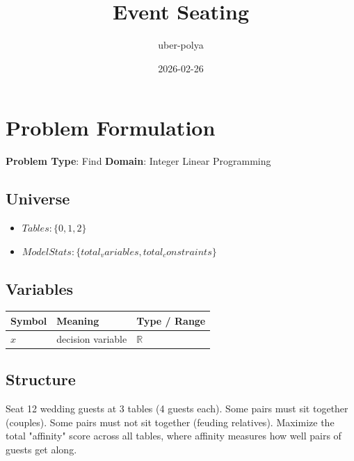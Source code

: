 \documentclass[11pt, a4paper]{article}
\title{Event Seating}
\author{uber-polya}
\date{2026-02-26}
\begin{document}
\maketitle
\tableofcontents
\newpage

\section{Problem Formulation}

\begin{polyamodel}

\textbf{Problem Type}: Find \hfill
\textbf{Domain}: Integer Linear Programming


\end{polyamodel}

\subsection{Universe}

\begin{itemize}
  \item $Tables: \{0, 1, 2\}$
  \item $Model Stats: \{total_variables, total_constraints\}$
\end{itemize}

\subsection{Variables}

\begin{longtable}{lll}
\toprule
\textbf{Symbol} & \textbf{Meaning} & \textbf{Type / Range} \\
\midrule
\endhead
$x$ & decision variable & $\mathbb{{R}}$ \\
\bottomrule
\end{longtable}

\subsection{Structure}

Seat 12 wedding guests at 3 tables (4 guests each). Some pairs must sit together (couples). Some pairs must not sit together (feuding relatives). Maximize the total "affinity" score across all tables, where affinity measures how well pairs of guests get along.
\end{document}
